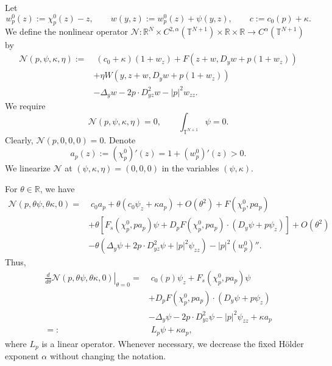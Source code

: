 \documentclass[preprint]{elsarticle}
\numberwithin{equation}{section}
\begin{document}
Let
$$
w_p^0(z):=\chi_p^0(z)-z,
\qquad
w(y,z):=w_p^0(z)+\psi(y,z),
\qquad
c:=c_0(p)+\kappa.
$$
We define the nonlinear operator
$
\mathcal N:\mathbb R^N\times C^{2,\alpha}(\mathbb T^{N+1})\times\mathbb R\times\mathbb R
\to C^\alpha(\mathbb T^{N+1})
$
by
\begin{equation*}
\begin{aligned}
\mathcal N(p,\psi,\kappa,\eta)
:=&\;
(c_0+\kappa)(1+w_z)
+
F\left(z+w,D_yw+p(1+w_z)\right)
\\
&+
\eta W\left(y,z+w,D_yw+p(1+w_z)\right)
\\
&-
\Delta_yw
-
2p\cdot D^2_{yz}w
-
|p|^2w_{zz}.
\end{aligned}
\end{equation*}
We require
\begin{equation*}
\mathcal N(p,\psi,\kappa,\eta)=0,
\qquad
\int_{\mathbb T^{N+1}}\psi=0.
\end{equation*}
Clearly,
$
\mathcal N(p,0,0,0)=0.
$
Denote
\begin{equation*}
a_p(z):=(\chi_p^0)'(z)=1+(w_p^0)'(z)>0.
\end{equation*}
We linearize $\mathcal N$ at $(\psi,\kappa,\eta)=(0,0,0)$ in the variables $(\psi,\kappa)$.

For $\theta\in\mathbb R$, we have
\begin{align*}
\mathcal N(p,\theta\psi,\theta\kappa,0)
=&\;
c_0a_p
+
\theta(c_0\psi_z+\kappa a_p)
+
O(\theta^2)
+
F(\chi_p^0,pa_p)
\\
&+
\theta\left[
F_s(\chi_p^0,pa_p)\psi
+
D_pF(\chi_p^0,pa_p)\cdot(D_y\psi+p\psi_z)
\right]
+
O(\theta^2)
\\
&-
\theta\left(
\Delta_y\psi
+
2p\cdot D^2_{yz}\psi
+
|p|^2\psi_{zz}
\right)
-
|p|^2(w_p^0)''.
\end{align*}
Thus,
\begin{equation*}
\begin{aligned}
\left.\frac{d}{d\theta}\mathcal N(p,\theta\psi,\theta\kappa,0)\right|_{\theta=0}
=&\;
c_0(p)\psi_z
+
F_s(\chi_p^0,pa_p)\psi
\\
&+
D_pF(\chi_p^0,pa_p)\cdot(D_y\psi+p\psi_z)
\\
&-
\Delta_y\psi
-
2p\cdot D^2_{yz}\psi
-
|p|^2\psi_{zz}
+
\kappa a_p
\\
=:&\;
L_p\psi+\kappa a_p,
\end{aligned}
\end{equation*}
where $L_p$ is a linear operator.
Whenever necessary, we decrease the fixed Hölder exponent $\alpha$ without changing the notation.
\end{document}
